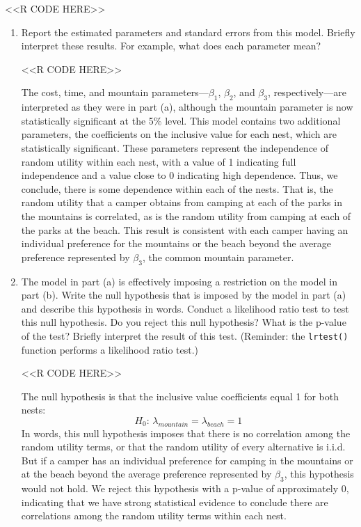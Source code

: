 \documentclass[11pt,letterpaper]{article}
\begin{document}
\begin{enumerate}[label=\alph*., leftmargin=*]
	<<R CODE HERE>>

	\begin{enumerate}[label=\roman*.]
		\item Report the estimated parameters and standard errors from this model. Briefly interpret these results. For example, what does each parameter mean?

		<<R CODE HERE>>

		The cost, time, and mountain parameters---$\beta_1$, $\beta_2$, and $\beta_3$, respectively---are interpreted as they were in part (a), although the mountain parameter is now statistically significant at the 5\% level. This model contains two additional parameters, the coefficients on the inclusive value for each nest, which are statistically significant. These parameters represent the independence of random utility within each nest, with a value of 1 indicating full independence and a value close to 0 indicating high dependence. Thus, we conclude, there is some dependence within each of the nests. That is, the random utility that a camper obtains from camping at each of the parks in the mountains is correlated, as is the random utility from camping at each of the parks at the beach. This result is consistent with each camper having an individual preference for the mountains or the beach beyond the average preference represented by $\beta_3$, the common mountain parameter.

		\item The model in part (a) is effectively imposing a restriction on the model in part (b). Write the null hypothesis that is imposed by the model in part (a) and describe this hypothesis in words. Conduct a likelihood ratio test to test this null hypothesis. Do you reject this null hypothesis? What is the p-value of the test? Briefly interpret the result of this test. (Reminder: the \texttt{lrtest()} function performs a likelihood ratio test.)

		<<R CODE HERE>>

		The null hypothesis is that the inclusive value coefficients equal 1 for both nests:
		$$H_0 \text{: } \lambda_{mountain} = \lambda_{beach} = 1$$
		In words, this null hypothesis imposes that there is no correlation among the random utility terms, or that the random utility of every alternative is i.i.d. But if a camper has an individual preference for camping in the mountains or at the beach beyond the average preference represented by $\beta_3$, this hypothesis would not hold. We reject this hypothesis with a p-value of approximately 0, indicating that we have strong statistical evidence to conclude there are correlations among the random utility terms within each nest.


\end{enumerate}
\end{enumerate}
\end{document}
